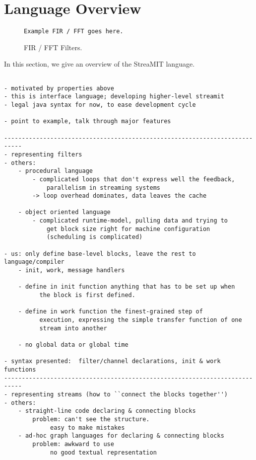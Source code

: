 \section{Language Overview}

\begin{figure}[t]
\scriptsize
\begin{verbatim}
Example FIR / FFT goes here.
\end{verbatim}
\vspace{-12pt}
\caption{\protect\small FIR / FFT Filters.
\protect\label{fig1}}
\vspace{-12pt}
\end{figure}

In this section, we give an overview of the StreaMIT language.

\begin{verbatim}

- motivated by properties above
- this is interface language; developing higher-level streamit
- legal java syntax for now, to ease development cycle

- point to example, talk through major features

---------------------------------------------------------------------------
- representing filters 
- others:
	- procedural language
		- complicated loops that don't express well the feedback,
			parallelism in streaming systems
		-> loop overhead dominates, data leaves the cache

	- object oriented language
		- complicated runtime-model, pulling data and trying to 
			get block size right for machine configuration
			(scheduling is complicated)

- us: only define base-level blocks, leave the rest to language/compiler
	- init, work, message handlers

	- define in init function anything that has to be set up when
          the block is first defined.

	- define in work function the finest-grained step of
          execution, expressing the simple transfer function of one
          stream into another

	- no global data or global time

- syntax presented:  filter/channel declarations, init & work functions
---------------------------------------------------------------------------
- representing streams (how to ``connect the blocks together'')
- others:
	- straight-line code declaring & connecting blocks
		problem: can't see the structure.
			 easy to make mistakes
	- ad-hoc graph languages for declaring & connecting blocks
		problem: awkward to use
			 no good textual representation


\end{verbatim}
